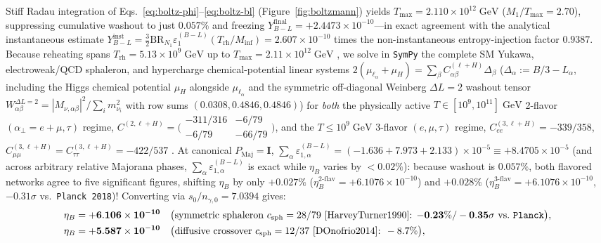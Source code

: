 \documentclass[11pt,a4paper]{article}
\begin{document}
Stiff Radau integration of Eqs.~\eqref{eq:boltz-phi}--\eqref{eq:boltz-bl} (Figure~\ref{fig:boltzmann}) yields $T_{\max} = 2.110\times 10^{12}\;\mathrm{GeV}$ ($M_1/T_{\max} = 2.70$), suppressing cumulative washout to just $\mathbf{0.057\%}$ and freezing $Y_{B-L}^{\mathrm{final}} = +2.4473\times 10^{-10}$—in exact agreement with the analytical instantaneous estimate $Y_{B-L}^{\mathrm{inst}} = \frac{3}{2}\mathrm{BR}_{N_1}\varepsilon_1^{(B-L)}(T_{\mathrm{rh}}/M_{\mathrm{inf}}) = 2.607\times 10^{-10}$ times the non-instantaneous entropy-injection factor $0.9387$. Because reheating spans $T_{\mathrm{rh}} = 5.13\times 10^9\;\mathrm{GeV}$ up to $T_{\max} = 2.11\times 10^{12}\;\mathrm{GeV}$ \cite{Abada2006,Nardi2006}, we solve in \texttt{SymPy} the complete SM Yukawa, electroweak/QCD sphaleron, and hypercharge chemical-potential linear systems $2(\mu_{\ell_\alpha}+\mu_H) = \sum_\beta C_{\alpha\beta}^{(\ell+H)}\Delta_\beta$ ($\Delta_\alpha := B/3 - L_\alpha$, including the Higgs chemical potential $\mu_H$ alongside $\mu_{\ell_\alpha}$ and the symmetric off-diagonal Weinberg $\Delta L = 2$ washout tensor $W_{\alpha\beta}^{\Delta L=2} = |M_{\nu,\alpha\beta}|^2/\sum_i m_{\nu_i}^2$ with row sums $(0.0308, 0.4846, 0.4846)$) for \emph{both} the physically active $T \in [10^9, 10^{11}]\;\mathrm{GeV}$ 2-flavor $(\alpha_\perp = e+\mu, \tau)$ regime, $C^{(2,\ell+H)} = \bigl(\begin{smallmatrix}-311/316 & -6/79\\ -6/79 & -66/79\end{smallmatrix}\bigr)$, and the $T \le 10^9\;\mathrm{GeV}$ 3-flavor $(e,\mu,\tau)$ regime, $C_{ee}^{(3,\ell+H)} = -339/358$, $C_{\mu\mu}^{(3,\ell+H)} = C_{\tau\tau}^{(3,\ell+H)} = -422/537$ \cite{Nardi2006}. At canonical $P_{\mathrm{Maj}} = \mathbf{I}$, $\sum_\alpha \varepsilon_{1,\alpha}^{(B-L)} = (-1.636 + 7.973 + 2.133)\times 10^{-5} \equiv +8.4705\times 10^{-5}$ (and across arbitrary relative Majorana phases, $\sum_\alpha \varepsilon_{1,\alpha}^{(B-L)}$ is exact while $\eta_B$ varies by $< 0.02\%$): because washout is $0.057\%$, both flavored networks agree to five significant figures, shifting $\eta_B$ by only $\mathbf{+0.027\%}$ ($\eta_B^{\mathrm{2\text{-}flav}} = +6.1076\times 10^{-10}$) and $\mathbf{+0.028\%}$ ($\eta_B^{\mathrm{3\text{-}flav}} = +6.1076\times 10^{-10}$, $-0.31\sigma$ vs.\ \texttt{Planck 2018})! Converting via $s_0/n_{\gamma,0} = 7.0394$ gives:
\begin{align}
\eta_B &= \mathbf{+6.106\times 10^{-10}}\quad\bigl(\text{symmetric sphaleron } c_{\mathrm{sph}} = 28/79\text{ \cite{HarveyTurner1990}: }\mathbf{-0.23\% / -0.35\sigma}\text{ vs.\ \texttt{Planck}}\bigr), \nonumber\\
\eta_B &= \mathbf{+5.587\times 10^{-10}}\quad\bigl(\text{diffusive crossover } c_{\mathrm{sph}} = 12/37\text{ \cite{DOnofrio2014}: }-8.7\%\bigr),
\label{eq:eta-b-final}
\end{align}
\end{document}
